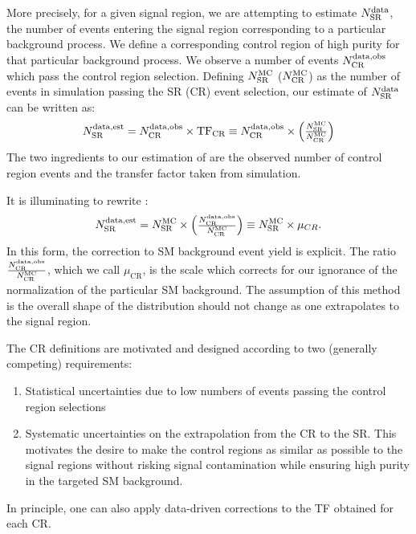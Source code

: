 More precisely, for a given signal region, we are attempting to estimate $\ntext{SR}{data}$, the number of events entering the signal region corresponding to a particular background process.
We define a corresponding control region of high purity for that particular background process.
We observe a number of events $\ntext{CR}{data,obs}$ which pass the control region selection.
Defining $\ntext{SR}{MC}$ ($\ntext{CR}{MC}$) as the number of events in simulation passing the SR (CR) event selection, our estimate of $\ntext{SR}{data}$ can be written as:
\begin{align}\label{eq:bkg_est}
\ntext{SR}{data,est} = \ntext{CR}{data,obs} \times \text{TF}_{\text{CR}} \equiv \ntext{CR}{data,obs} \times  \begin{pmatrix} \frac{ \ntext{SR}{MC} }{ \ntext{CR}{MC} } \end{pmatrix}
\end{align}
The two ingredients to our estimation of  are the observed number of control region events  and the transfer factor taken from simulation.

It is illuminating to rewrite :
\begin{align}\label{eq:bkg_est_simple}
\ntext{SR}{data,est} = \ntext{SR}{MC} \times  \begin{pmatrix} \frac{\ntext{CR}{data,obs}  }{ \ntext{CR}{MC} } \end{pmatrix} \equiv \ntext{SR}{MC} \times \mu_{CR}.
\end{align}
In this form, the correction to SM background event yield is explicit.
The ratio $\frac{\ntext{CR}{data,obs}}{ \ntext{CR}{MC} }$, which we call $\mu_{\text{CR}}$, is the scale which corrects for our ignorance of the normalization of the particular SM background.
The assumption of this method is the overall shape of the distribution should not change as one extrapolates to the signal region.

The CR definitions are motivated and designed according to two (generally competing) requirements:
\begin{enumerate}
\item Statistical uncertainties due to low numbers of events passing the control region selections
\item Systematic uncertainties on the extrapolation from the CR to the SR.  This motivates the desire to make the control regions as similar as possible to the signal regions without risking signal contamination while ensuring high purity in the targeted SM background.
\end{enumerate}
In principle, one can also apply data-driven corrections to the TF obtained for each CR.


